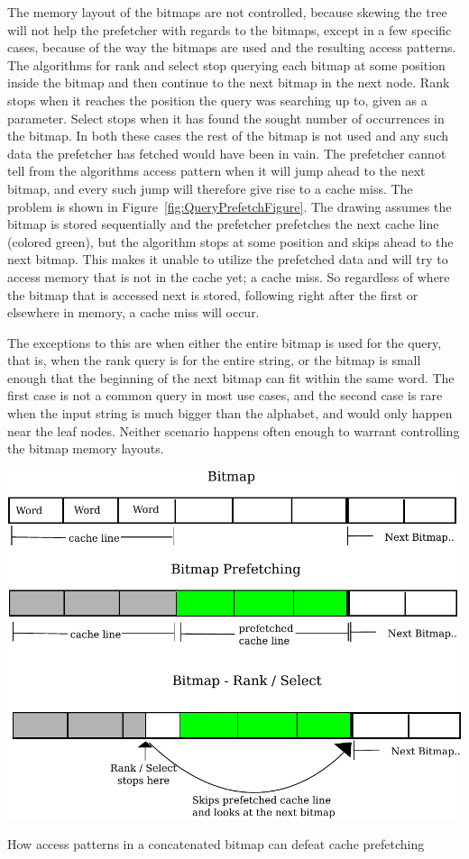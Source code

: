 The memory layout of the bitmaps are not controlled, because skewing the tree will not help the prefetcher with regards to the bitmaps, except in a few specific cases, because of the way the bitmaps are used and the resulting access patterns.
The algorithms for rank and select stop querying each bitmap at some position inside the bitmap and then continue to the next bitmap in the next node.
Rank stops when it reaches the position the query was searching up to, given as a parameter.
Select stops when it has found the sought number of occurrences in the bitmap.
In both these cases the rest of the bitmap is not used and any such data the prefetcher has fetched would have been in vain.
The prefetcher cannot tell from the algorithms access pattern when it will jump ahead to the next bitmap, and every such jump will therefore give rise to a cache miss.
The problem is shown in Figure~\ref{fig:QueryPrefetchFigure}. The drawing assumes the bitmap is stored sequentially and the prefetcher prefetches the next cache line (colored green), but the algorithm stops at some position and skips ahead to the next bitmap. 
This makes it unable to utilize the prefetched data and will try to access memory that is not in the cache yet; a cache miss.
So regardless of where the bitmap that is accessed next is stored, following right after the first or elsewhere in memory, a cache miss will occur.

The exceptions to this are when either the entire bitmap is used for the query, that is, when the rank query is for the entire string, or the bitmap is small enough that the beginning of the next bitmap can fit within the same word.
The first case is not a common query in most use cases, and the second case is rare when the input string is much bigger than the alphabet, and would only happen near the leaf nodes.
Neither scenario happens often enough to warrant controlling the bitmap memory layouts.

\figureBegin

\includegraphics[width=\textwidth]{QueryPrefetchFigure.pdf}
\caption{How access patterns in a concatenated bitmap can defeat cache prefetching}
\label{fig:QueryPrefetchFigure}
\figureEnd




